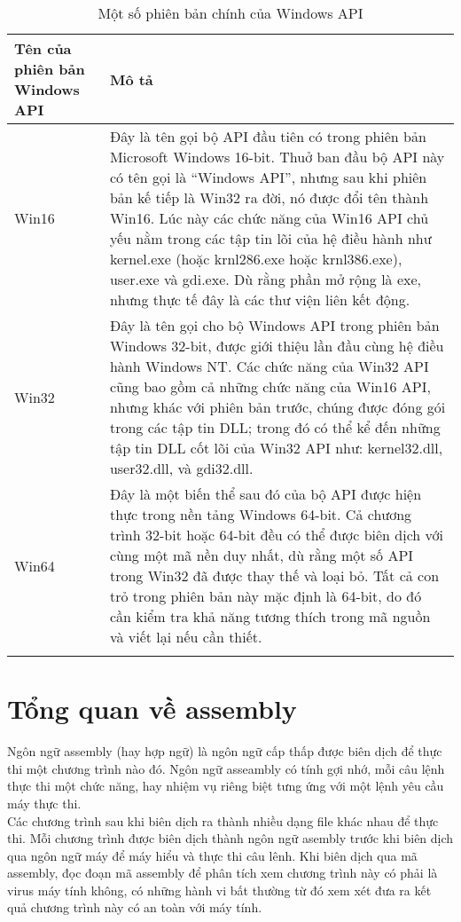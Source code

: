 \begin{longtable}{ | m{3cm} | m{11cm} | }
	\hline
Tên của phiên bản Windows API & Mô tả \\
	\hline
	\hline
Win16 & Đây là tên gọi bộ API đầu tiên có trong phiên bản Microsoft Windows 16-bit. Thuở ban đầu bộ API này có tên gọi là “Windows API”, nhưng sau khi phiên bản kế tiếp là Win32 ra đời, nó được đổi tên thành Win16. Lúc này các chức năng của Win16 API chủ yếu nằm trong các tập tin lõi của hệ điều hành như kernel.exe (hoặc krnl286.exe hoặc krnl386.exe), user.exe và gdi.exe. Dù rằng phần mở rộng là exe, nhưng thực tế đây là các thư viện liên kết động. \\
	\hline
Win32 & Đây là tên gọi cho bộ Windows API trong phiên bản Windows 32-bit, được giới thiệu lần đầu cùng hệ điều hành Windows NT. Các chức năng của Win32 API cũng bao gồm cả những chức năng của Win16 API, nhưng khác với phiên bản trước, chúng được đóng gói trong các tập tin DLL; trong đó có thể kể đến những tập tin DLL cốt lõi của Win32 API như: kernel32.dll, user32.dll, và gdi32.dll. \\
	\hline
Win64 & Đây là một biến thể sau đó của bộ API được hiện thực trong nền tảng Windows 64-bit. Cả chương trình 32-bit hoặc 64-bit đều có thể được biên dịch với cùng một mã nền duy nhất, dù rằng một số API trong Win32 đã được thay thế và loại bỏ. Tất cả con trỏ trong phiên bản này mặc định là 64-bit, do đó cần kiểm tra khả năng tương thích trong mã nguồn và viết lại nếu cần thiết. \\
	\hline

\caption[Một số phiên bản chính của Windows API]{Một số phiên bản chính của Windows API}
\label{table:tblwapiver}
\end{longtable}

\section{Tổng quan về assembly}
Ngôn ngữ assembly (hay hợp ngữ) là ngôn ngữ cấp thấp được biên dịch để thực thi một chương trình nào đó. Ngôn ngữ asseambly có tính gợi nhớ, mỗi câu lệnh thực thi một chức năng, hay nhiệm vụ riêng biệt tưng ứng với một lệnh yêu cầu máy thực thi. \\

Các chương trình sau khi biên dịch ra thành nhiều dạng file khác nhau để thực thi. Mỗi chương trình được biên dịch thành ngôn ngữ asembly trước khi biên dịch qua ngôn ngữ máy để máy hiểu và thực thi câu lênh. Khi biên dịch qua mã assembly, đọc đoạn mã assembly để phân tích xem chương trình này có phải là virus máy tính không, có những hành vi bất thường từ đó xem xét đưa ra kết quả chương trình này có an toàn với máy tính.\\

